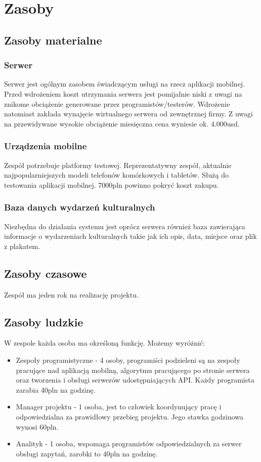 \documentclass[10pt]{dokument-ppi}
\begin{document}
\section{Zasoby}

\subsection{Zasoby materialne}

\subsubsection{Serwer}
Serwer jest ogólnym zasobem świadczącym usługi na rzecz aplikacji mobilnej. Przed wdrożeniem koszt utrzymania serwera jest pomijalnie niski z uwagi na znikome obciążenie generowane przez programistów/testerów. Wdrożenie natomiast zakłada wynajęcie wirtualnego serwera od zewnętrznej firmy. Z uwagi na przewidywane wysokie obciążenie miesięczna cena wyniesie ok. 4.000usd.

\subsubsection{Urządzenia mobilne}
Zespół potrzebuje platformy testowej. Reprezentatywny zespół, aktualnie najpopularniejszych modeli telefonów komórkowych i tabletów. Służą do testowania aplikacji mobilnej. 7000pln powinno pokryć koszt zakupu.

\subsubsection{Baza danych wydarzeń kulturalnych}
Niezbędna do działania systemu jest oprócz serwera również baza zawierająca informacje o wydarzeniach kulturalnych takie jak ich opis, data, miejsce oraz plik z plakatem.

\subsection{Zasoby czasowe}
Zespół ma jeden rok na realizację projektu.

\subsection{Zasoby ludzkie}
W zespole każda osoba ma określoną funkcję. Możemy wyróżnić:
\begin{itemize}
  \item Zespoły programistyczne - 4 osoby, programiści podzieleni są na zespoły pracujące nad aplikacją mobilną, algorytmu pracującego po stronie serwera oraz tworzenia i obsługi serwerów udostępniających API. Każdy programista zarabia 40pln na godzinę.
  
  \item Manager projektu - 1 osoba, jest to człowiek koordynujący pracę i odpowiedzialna za prawidłowy przebieg projektu. Jego stawka godzinowa wynosi 60pln.

  \item Analityk - 1 osoba, wspomaga programistów odpowiedzialnych za serwer obsługi zapytań, zarobki to 40pln na godzinę.
\end{itemize}
\end{document}
